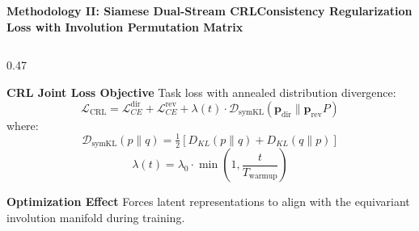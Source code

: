 \documentclass[aspectratio=169,10pt]{beamer}
\begin{document}
\begin{frame}{\textbf{Methodology II: Siamese Dual-Stream CRL}}{\textbf{Consistency Regularization Loss with Involution Permutation Matrix}}
\begin{columns}[T]
    \begin{column}{0.47\textwidth}
      \begin{block}{\textbf{CRL Joint Loss Objective}}
        \footnotesize
        Task loss with annealed distribution divergence:
        \vspace{-2pt}
        \[ \mathcal{L}_{\text{CRL}} = \mathcal{L}_{CE}^{\text{dir}} + \mathcal{L}_{CE}^{\text{rev}} + \lambda(t) \cdot \mathcal{D}_{\text{symKL}}\left(\mathbf{p}_{\text{dir}} \parallel \mathbf{p}_{\text{rev}} P\right) \]
        where:
        \vspace{-2pt}
        \[ \mathcal{D}_{\text{symKL}}(p \parallel q) = \tfrac{1}{2}\left[D_{KL}(p \parallel q) + D_{KL}(q \parallel p)\right] \]
        \vspace{-3pt}
        \[ \lambda(t) = \lambda_0 \cdot \min\left(1, \frac{t}{T_{\text{warmup}}}\right) \]
        \vspace{-2pt}
      \end{block}
      \vspace{0.05cm}
      \begin{exampleblock}{\textbf{Optimization Effect}}
        \footnotesize
        Forces latent representations to align with the equivariant involution manifold during training.
      \end{exampleblock}
    \end{column}
  \end{columns}
\end{frame}
\end{document}
